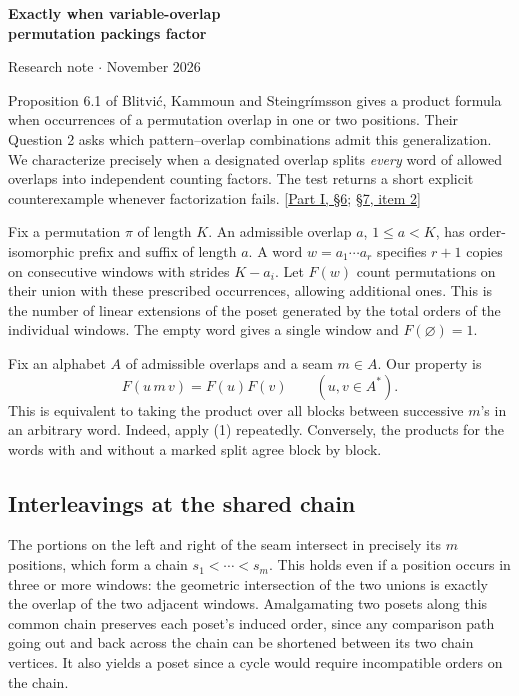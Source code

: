 \documentclass[11pt]{article}
\begin{document}
\begin{center}{\Large\bfseries Exactly when variable-overlap\\ permutation packings factor}\par
\small Research note \enspace$\cdot$ November 2026\end{center}

Proposition 6.1 of Blitvi\'c, Kammoun and Steingr\'imsson gives a product formula when occurrences of a permutation overlap in one or two positions. Their Question 2 asks which pattern--overlap combinations admit this generalization. We characterize precisely when a designated overlap splits \emph{every} word of allowed overlaps into independent counting factors. The test returns a short explicit counterexample whenever factorization fails. [\href{https://arxiv.org/html/2610.29846v1\#S6}{Part I, \S6}; \href{https://arxiv.org/html/2610.29846v1\#S7}{\S7, item 2}]

Fix a permutation $\pi$ of length $K$. An admissible overlap $a$, $1\le a<K$, has order-isomorphic prefix and suffix of length $a$. A word $w=a_1\cdots a_r$ specifies $r+1$ copies on consecutive windows with strides $K-a_i$. Let $F(w)$ count permutations on their union with these prescribed occurrences, allowing additional ones. This is the number of linear extensions of the poset generated by the total orders of the individual windows. The empty word gives a single window and $F(\varnothing)=1$.

Fix an alphabet $A$ of admissible overlaps and a seam $m\in A$. Our property is
\[
                   F(u\,m\,v)=F(u)F(v)\qquad(u,v\in A^*).
 \tag{1}
\]
This is equivalent to taking the product over all blocks between successive $m$'s in an arbitrary word. Indeed, apply (1) repeatedly. Conversely, the products for the words with and without a marked split agree block by block.

\subsection*{Interleavings at the shared chain}
The portions on the left and right of the seam intersect in precisely its $m$ positions, which form a chain $s_1<\cdots<s_m$. This holds even if a position occurs in three or more windows: the geometric intersection of the two unions is exactly the overlap of the two adjacent windows. Amalgamating two posets along this common chain preserves each poset's induced order, since any comparison path going out and back across the chain can be shortened between its two chain vertices. It also yields a poset since a cycle would require incompatible orders on the chain.
\end{document}
